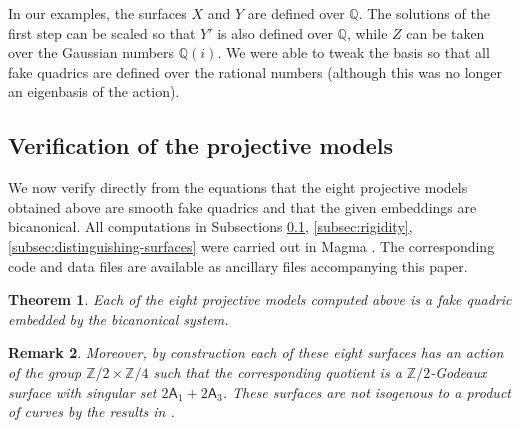 \documentclass[11pt,a4paper]{article}
\newtheorem{theorem}{Theorem}[section]
\newtheorem{remark}[theorem]{Remark}
\begin{document}
In our examples, the surfaces \(X\) and \(Y\) are defined over \(\mathbb Q\).
The solutions of the first step can be scaled so that \(Y'\) is also defined over
\(\mathbb Q\), while \(Z\) can be taken over the Gaussian numbers \(\mathbb Q(i)\).
We were able to tweak the basis so that all fake quadrics are defined over the rational numbers
(although this was no longer an eigenbasis of the action).




\subsection{Verification of the projective models}
\label{subsec:verification}

We now verify directly from the equations that the eight projective models obtained above are smooth 
fake quadrics and that the given embeddings are bicanonical. All computations in Subsections \ref{subsec:verification},
\ref{subsec:rigidity}, \ref{subsec:distinguishing-surfaces} were carried out in Magma \cite{BCP}.
The corresponding code and data files are available as ancillary files accompanying this paper.

\begin{theorem}
Each of the eight projective models computed above is a fake quadric embedded by the bicanonical system.
\end{theorem}

\begin{remark}
Moreover, by construction each of these eight surfaces has an action of the group
$\mathbb Z/2\times\mathbb Z/4$ such that the corresponding quotient is a $\mathbb Z/2$-Godeaux surface
with singular set $2\mathsf A_1+2\mathsf A_3$.
These surfaces are not isogenous to a product of curves by the results in \cite{RitoExplicitFQ}.
\end{remark}
\end{document}
